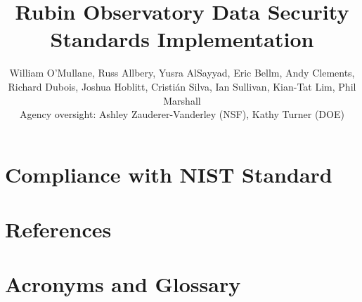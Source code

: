 \documentclass[DM,authoryear,toc]{lsstdoc}
\title{Rubin Observatory Data Security Standards Implementation}
\author{%
William O'Mullane,
Russ Allbery,
Yusra AlSayyad,
Eric Bellm,
Andy Clements,
Richard Dubois,
Joshua Hoblitt,
Cristi\'{a}n Silva,
Ian Sullivan,
Kian-Tat Lim,
Phil Marshall\\
Agency oversight: Ashley Zauderer-Vanderley (NSF), Kathy Turner (DOE)
}
\date{\vcsDate}
\begin{document}
\maketitle


\newpage
\appendix

\section{Compliance with NIST Standard}\label{sec:compliance}


\newpage
\section{References} \label{sec:bib}
\renewcommand{\refname}{} %


\section{Acronyms and Glossary} \label{sec:acronyms}
%
\printglossaries
\end{document}

